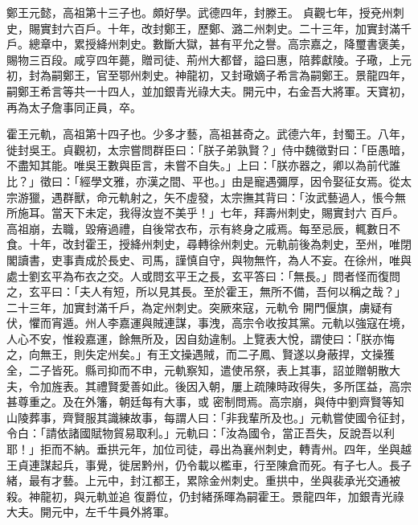 \begin{pinyinscope}
 鄭王元懿，高祖第十三子也。頗好學。武德四年，封滕王。
 貞觀七年，授兗州刺史，賜實封六百戶。十年，改封鄭王，歷鄭、潞二州刺史。二十三年，加實封滿千戶。總章中，累授絳州刺史。數斷大獄，甚有平允之譽。高宗嘉之，降璽書褒美，賜物三百段。咸亨四年薨，贈司徒、荊州大都督，謚曰惠，陪葬獻陵。子璥，上元初，封為嗣鄭王，官至鄂州刺史。神龍初，又封璥嫡子希言為嗣鄭王。景龍四年，嗣鄭王希言等共一十四人，並加銀青光祿大夫。開元中，右金吾大將軍。天寶初，再為太子詹事同正員，卒。



 霍王元軌，高祖第十四子也。少多才藝，高祖甚奇之。武德六年，封蜀王。八年，徙封吳王。貞觀初，太宗嘗問群臣曰：「朕子弟孰賢？」侍中魏徵對曰：「臣愚暗，不盡知其能。唯吳王數與臣言，未嘗不自失。」上曰：「朕亦器之，卿以為前代誰比？」徵曰：「經學文雅，亦漢之間、平也。」由是寵遇彌厚，因令娶征女焉。從太宗游獵，遇群獸，命元軌射之，矢不虛發，太宗撫其背曰：「汝武藝過人，悵今無所施耳。當天下未定，我得汝豈不美乎！」七年，拜壽州刺史，賜實封六
 百戶。高祖崩，去職，毀瘠過禮，自後常衣布，示有終身之戚焉。每至忌辰，輒數日不食。十年，改封霍王，授絳州刺史，尋轉徐州刺史。元軌前後為刺史，至州，唯閉閣讀書，吏事責成於長史、司馬，謹慎自守，與物無忤，為人不妄。在徐州，唯與處士劉玄平為布衣之交。人或問玄平王之長，玄平答曰：「無長。」問者怪而復問之，玄平曰：「夫人有短，所以見其長。至於霍王，無所不備，吾何以稱之哉？」二十三年，加實封滿千戶，為定州刺史。突厥來寇，元軌令
 開門偃旗，虜疑有伏，懼而宵遁。州人李嘉運與賊連謀，事洩，高宗令收按其黨。元軌以強寇在境，人心不安，惟殺嘉運，餘無所及，因自劾違制。上覽表大悅，謂使曰：「朕亦悔之，向無王，則失定州矣。」有王文操遇賊，而二子鳳、賢遂以身蔽捍，文操獲全，二子皆死。縣司抑而不申，元軌察知，遣使吊祭，表上其事，詔並贈朝散大夫，令加旌表。其禮賢愛善如此。後因入朝，屢上疏陳時政得失，多所匡益，高宗甚尊重之。及在外籓，朝廷每有大事，或
 密制問焉。高宗崩，與侍中劉齊賢等知山陵葬事，齊賢服其識練故事，每謂人曰：「非我輩所及也。」元軌嘗使國令征封，令白：「請依諸國賦物貿易取利。」元軌曰：「汝為國令，當正吾失，反說吾以利耶！」拒而不納。垂拱元年，加位司徒，尋出為襄州刺史，轉青州。四年，坐與越王貞連謀起兵，事覺，徙居黔州，仍令載以檻車，行至陳倉而死。有子七人。長子緒，最有才藝。上元中，封江都王，累除金州刺史。重拱中，坐與裴承光交通被殺。神龍初，與元軌並追
 復爵位，仍封緒孫暉為嗣霍王。景龍四年，加銀青光祿大夫。開元中，左千牛員外將軍。




\end{pinyinscope}
